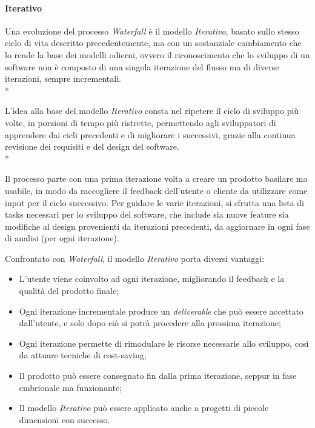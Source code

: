 \documentclass[../main.tex]{subfiles}
\begin{document}
        		\paragraph{Iterativo}
        		Una evoluzione del processo \emph{Waterfall} è il modello \emph{Iterativo}\cite{iterative}, basato sullo stesso ciclo di vita descritto precedentemente, ma con un sostanziale cambiamento che lo rende la base dei modelli odierni, ovvero il riconoscimento che lo sviluppo di un software non è composto di una singola iterazione del flusso ma di diverse iterazioni, sempre incrementali.\\*
        		
        		L'idea alla base del modello \emph{Iterativo} consta nel ripetere il ciclo di sviluppo più volte, in porzioni di tempo più ristrette, permettendo agli sviluppatori di apprendere dai cicli precedenti e di migliorare i successivi, grazie alla continua revisione dei requisiti e del design del software.\\*
        		
        		Il processo parte con una prima iterazione volta a creare un prodotto basilare ma usabile, in modo da raccogliere il feedback dell'utente o cliente da utilizzare come input per il ciclo successivo. Per guidare le varie iterazioni, si sfrutta una lista di tasks necessari per lo sviluppo del software, che include sia nuove feature sia modifiche al design provenienti da iterazioni precedenti, da aggiornare in ogni fase di analisi (per ogni iterazione).
        		
        		Confrontato con \emph{Waterfall}, il modello \emph{Iterativo} porta diversi vantaggi:
        		\begin{itemize}
        			\item L'utente viene coinvolto ad ogni iterazione, migliorando il feedback e la qualità del prodotto finale;
        			\item Ogni iterazione incrementale produce un \emph{deliverable} che può essere accettato dall'utente, e solo dopo ciò si potrà procedere alla prossima iterazione;
        			\item Ogni iterazione permette di rimodulare le risorse necessarie allo sviluppo, così da attuare tecniche di cost-saving;
        			\item Il prodotto può essere consegnato fin dalla prima iterazione, seppur in fase embrionale ma funzionante;
        			\item Il modello \emph{Iterativo} può essere applicato anche a progetti di piccole dimensioni con successo.
        		\end{itemize}
        
\end{document}
